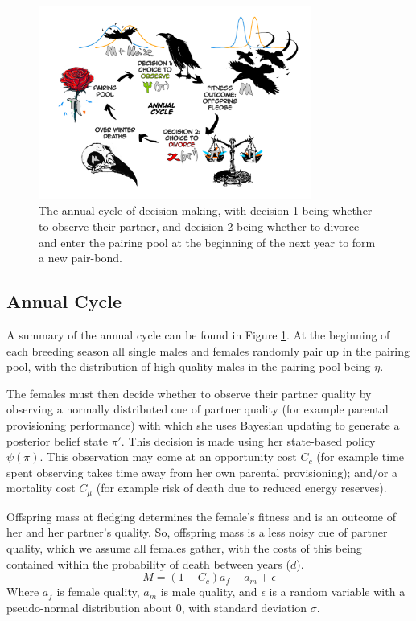 \documentclass[10pt]{article} %
\begin{document}
\begin{figure}
	\centering
	\includegraphics[width=0.8\textwidth]{../figures/drawing2.png}
	\caption{The annual cycle of decision making, with decision 1 being whether to observe their partner, and decision 2 being whether to divorce and enter the pairing pool at the beginning of the next year to form a new pair-bond.}
	\label{Fig:1-2}
\end{figure}

\subsection{Annual Cycle}
A summary of the annual cycle  can be found in Figure \ref{Fig:1-2}. At the beginning of each breeding season all single males and females randomly pair up in the pairing pool, with the distribution of high quality males in the pairing pool being $\eta$. 

The females must then decide whether to observe their partner quality by observing a normally distributed cue of partner quality (for example parental provisioning performance) with which she uses Bayesian updating to generate a posterior belief state $\pi'$. This decision is made using her state-based policy $\psi(\pi)$. This observation may come at an opportunity cost $C_c$  (for example time spent observing takes time away from her own parental provisioning); and/or a mortality cost $C_\mu$ (for example risk of death due to reduced energy reserves). 

Offspring mass at fledging determines the female’s fitness and is an outcome of her and her partner’s quality. So, offspring mass is a less noisy cue of partner quality, which we assume all females gather, with the costs of this being contained within the probability of death between years ($d$). 
\begin{equation}
	M=(1-C_c)a_{f}+a_{m}+\epsilon\label{eq:1}
\end{equation}
Where $ a_f $ is female quality, $ a_m $ is male quality, and $ \epsilon $ is a random variable with a pseudo-normal distribution about 0, with standard deviation $\sigma$.
\end{document}
